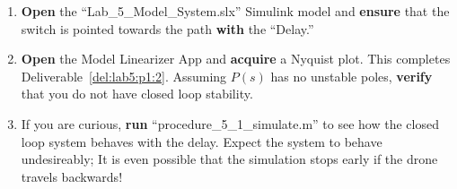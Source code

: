 \begin{procedure}[label={proc:lab5:1}]
\begin{enumerate}[label={(\arabic*)}]
{    }
    \item{%
      \textbf{Open} the ``Lab\_5\_Model\_System.slx'' Simulink model and \textbf{ensure} that the switch is pointed towards the path \textbf{with} the ``Delay.''
    }
    \item{%
      \textbf{Open} the Model Linearizer App and \textbf{acquire} a Nyquist plot.
      This completes Deliverable~\ref{del:lab5:p1:2}.
      Assuming \(P(s)\) has no unstable poles, \textbf{verify} that you do not have closed loop stability.
    }
    \item{%
      If you are curious, \textbf{run} ``procedure\_5\_1\_simulate.m'' to see how the closed loop system behaves with the delay.
      Expect the system to behave undesireably;
      It is even possible that the simulation stops early if the drone travels backwards!
    }
  \end{enumerate}
\end{procedure}

